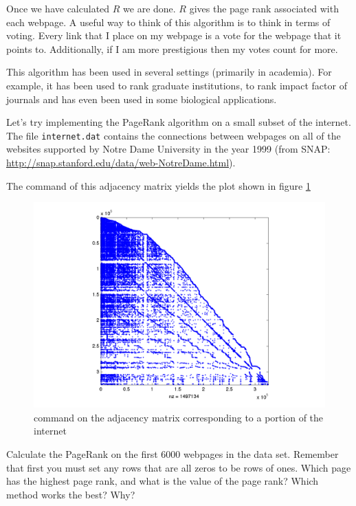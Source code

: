 Once we have calculated $R$ we are done. $R$ gives the page rank associated with each webpage. A useful way to think of this algorithm is to think in terms of voting. Every link that I place on my webpage is a vote for the webpage that it points to. Additionally, if I am more prestigious then my votes count for more.

This algorithm has been used in several settings (primarily in academia). For example, it has been used to rank graduate institutions, to rank impact factor of journals and has even been used in some biological applications.

Let's try implementing the PageRank algorithm on a small subset of the internet. The file \texttt{internet.dat} contains the connections between webpages on all of the websites supported by Notre Dame University in the year 1999 (from SNAP: \url{http://snap.stanford.edu/data/web-NotreDame.html}).

The  command of this adjacency matrix yields the plot shown in figure \ref{Fig:WebSparse}


\begin{figure}
\begin{center}
\includegraphics[scale = .4]{WebSparse.pdf}
\caption{ command on the adjacency matrix corresponding to a portion of the internet}
\label{Fig:WebSparse}
\end{center}
\end{figure}

\begin{problem}
\label{prob:pg_calc}
Calculate the PageRank on the first 6000 webpages in the data set. Remember that first you must set any rows that are all zeros to be rows of ones. Which page has the highest page rank, and what is the value of the page rank? Which method works the best? Why?
\end{problem}

